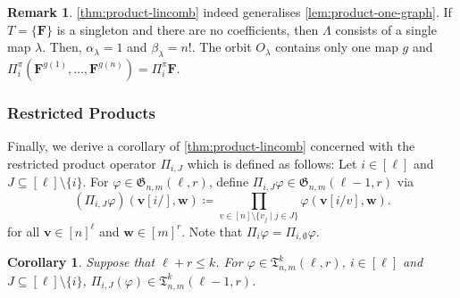 \documentclass[11pt, DIV=15]{scrarticle}
\theoremstyle{definition}
\newtheorem{remark}[definition]{Remark}
\theoremstyle{plain}
\newtheorem{corollary}[definition]{Corollary}
\theoremstyle{remark}
\renewcommand{\phi}{\varphi}
\begin{document}
	\begin{remark}
		\cref{thm:product-lincomb} indeed generalises \cref{lem:product-one-graph}.
		If $T = \{\boldsymbol{F}\}$ is a singleton and there are no coefficients,
		then $\Lambda$ consists of a single map $\lambda$.
		Then, $\alpha_\lambda = 1$ and  $\beta_\lambda = n!$.
		The orbit $O_\lambda$ contains only one map $g$ and $\Pi_i^\pi(\boldsymbol{F}^{g(1)}, \dots, \boldsymbol{F}^{g(n)}) = \Pi_i^\pi \boldsymbol{F}$.
	\end{remark}

	\subsubsection{Restricted Products}
	
	Finally, we derive a corollary of \cref{thm:product-lincomb} concerned with the restricted product operator $\Pi_{i, J}$ which is defined as follows:
	Let $i \in [\ell]$ and $J \subseteq [\ell] \setminus \{i\}$.
	For $\phi \in \mathfrak{G}_{n,m}(\ell, r)$,
	define $\Pi_{i, J} \phi \in \mathfrak{G}_{n,m}(\ell-1, r)$
	via \[ (\Pi_{i, J} \phi)(\boldsymbol{v}[i/], \boldsymbol{w}) \coloneqq \prod_{v \in [n] \setminus \{v_j \mid j \in J\}} \phi(\boldsymbol{v}[i/v], \boldsymbol{w}). \]
	for all $\boldsymbol{v} \in [n]^\ell$ and $\boldsymbol{w} \in [m]^r$.
	Note that $\Pi_i \phi = \Pi_{i, \emptyset} \phi$.

	
	\begin{corollary}\label{cor:product-exclude-lincomb}
		Suppose that $\ell+r \leq k$.
		For $\phi \in \mathfrak{T}^k_{n,m}(\ell,r )$,  $i \in [\ell]$ and $J \subseteq [\ell] \setminus \{i\}$,
		 $\Pi_{i, J} (\phi) \in \mathfrak{T}^k_{n,m}(\ell-1, r)$.
	\end{corollary}
\end{document}
